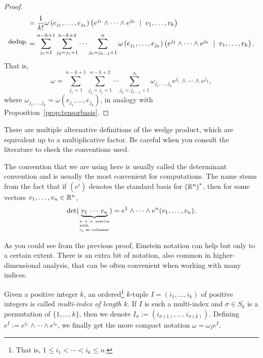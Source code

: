 \begin{proof}
\begin{align}
    &= \frac1{k!} \omega\left(e_{j_1}, \ldots, e_{j_k}\right) \left( e^{j_1}\wedge \cdots \wedge e^{j_k} \;\mid\; v_1, \ldots, v_k\right) \\
    \overset{\mbox{\small dedup.}}{}
    &= \sum_{j_1=1}^{n-k+1}\sum_{j_2=j_1+1}^{n-k+2}\cdots \sum_{j_k=j_{k-1}+1}^{n} \omega\left(e_{j_1}, \ldots, e_{j_k}\right) \left(e^{j_1}\wedge \cdots \wedge e^{j_k} \;\mid\; v_1, \ldots, v_k\right).
  \end{align}
  That is,
  \begin{equation}
    \omega = \sum_{j_1=1}^{n-k+1}\sum_{j_2=j_1+1}^{n-k+2}\cdots \sum_{j_k=j_{k-1}+1}^{n} \omega_{j_1, \ldots, j_k} e^{j_1}\wedge \cdots \wedge e^{j_k},
  \end{equation}
  where $\omega_{j_1, \ldots, j_k} = \omega\left(e_{j_1}, \ldots, e_{j_k}\right)$, in analogy with Proposition~\ref{prop:tensorbasis}.
\end{proof}

\begin{remark}
  There are multiple alternative definitions of the wedge product, which are equivalent up to a multiplicative factor.
  Be careful when you consult the literature to check the conventions used.

  The convention that we are using here is usually called the determinant convention and is usually the most convenient for computations. The name stems from the fact that if $(e^i)$ denotes the standard basis for ${(\mathbb{R}^n)}^*$, then for some vectors $v_1, \ldots, v_n \in\mathbb{R}^n$,
  \begin{equation}
    \det(\LaTeXunderbrace{v_1 \,\cdots\, v_n}_{\parbox{1.5cm}{\tiny $n\times n$ matrix with\\$v_i$ as columns}}) = e^1\wedge\cdots\wedge e^n(v_1,\ldots,v_n).
  \end{equation}
\end{remark}

As you could see from the previous proof, Einstein notation can help but only to a certain extent.
There is an extra bit of notation, also common in higher-dimensional analysis, that can be often convenient when working with many indices.
\begin{notation}
  Given a positive integer $k$, an ordered\footnote{That is, $1\leq i_1<\cdots<i_k\leq n$.} $k$-tuple $I=(i_1, \ldots, i_k)$ of positive integers is called \emph{multi-index of length $k$}.
  If $I$ is such a multi-index and $\sigma\in S_k$ is a permutation of $\{1,\ldots,k\}$, then we denote $I_\sigma := (i_{\sigma(1)}, \ldots, i_{\sigma(k)})$.
  Defining $e^I := e^{i_1}\wedge\cdots\wedge e^{i_k}$, we finally get the more compact notation $\omega = \omega_I e^I$.
\end{notation}

